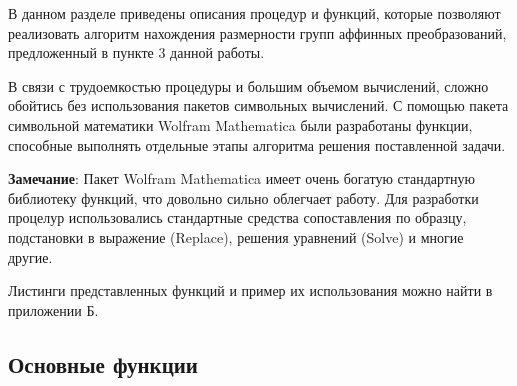 \documentclass[../main.tex]{subfiles}
\begin{document}
В данном разделе приведены описания процедур и функций, которые позволяют реализовать алгоритм нахождения размерности групп аффинных преобразований, предложенный в пункте 3 данной работы. 

В связи с трудоемкостью процедуры и большим объемом вычислений, сложно обойтись без использования пакетов символьных вычислений. С помощью пакета символьной математики {\ttfamily Wolfram Mathematica} были разработаны функции, способные выполнять отдельные этапы алгоритма решения поставленной задачи.

\textbf{Замечание}: Пакет {\ttfamily Wolfram Mathematica} имеет очень богатую стандартную библиотеку функций, что довольно сильно облегчает работу. Для разработки процелур использовались стандартные средства сопоставления по образцу, подстановки в выражение ({\ttfamily Replace}), решения уравнений ({\ttfamily Solve}) и многие другие.

Листинги представленных функций и пример их использования можно найти в приложении Б.

\subsection{Основные функции}
\end{document}
